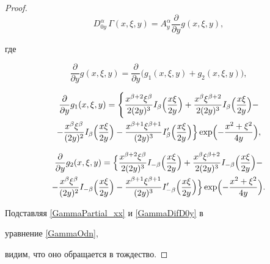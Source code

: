 \begin{proof}
\begin{equation}
D^{\alpha}_{0y}\,\Gamma(x,\xi,y)=A^{\alpha}_{y} \frac{\partial}{\partial y} g(x,\xi,y),

\end{equation}

где 

$$

\frac{\partial}{\partial y} g(x,\xi,y)= 

\frac{\partial}{\partial y} \bigl( g_1(x,\xi,y)+ g_2(x,\xi,y)\bigr),

$$

\begin{multline}

\frac{\partial}{\partial y} g_1(x,\xi,y)=

\Biggl\{

\frac{ x^{\beta+2}\xi^{\beta}}{2 (2y)^3}

I_{\beta}\Bigl(\frac{x\xi}{2y}\Bigr)+

\frac{ x^{\beta}\xi^{\beta+2}}{2 (2y)^3}

I_{\beta}\Bigl(\frac{x\xi}{2y}\Bigr)-

\\

-\frac{x^{\beta}\xi^{\beta}}{(2y)^2}

I_{\beta}\Bigl(\frac{x\xi}{2y}\Bigr)-

\frac{x^{\beta+1}\xi^{\beta+1}}{(2y)^3}

I'_{\beta}\Bigl(\frac{x\xi}{2y}\Bigr)\Bigr\}\exp \Bigl({-\frac{ x^2+\xi^2}{4y}}\Bigr),

\end{multline}

\begin{multline}

\frac{\partial}{\partial y} g_2(x,\xi,y)=

\Bigl\{

\frac{ x^{\beta+2}\xi^{\beta}}{2 (2y)^3}

I_{-\beta}\Bigl(\frac{x\xi}{2y}\Bigr)+

\frac{ x^{\beta}\xi^{\beta+2}}{2 (2y)^3}

I_{-\beta}\Bigl(\frac{x\xi}{2y}\Bigr)-

\\

-\frac{x^{\beta}\xi^{\beta}}{(2y)^2}

I_{-\beta}\Bigl(\frac{x\xi}{2y}\Bigr)-

\frac{x^{\beta+1}\xi^{\beta+1}}{(2y)^3}

I'_{-\beta}\Bigl(\frac{x\xi}{2y}\Bigr)\Bigr\}\exp\Bigl({-\frac{ x^2+\xi^2}{4y}}\Bigr).

\end{multline}

Подставляя \eqref{GammaPartial_xx} и \eqref{GammaDifD0y} в 

 уравнение \eqref{GammaOdn},

видим, что оно обращается в тождество.

\end{proof}



